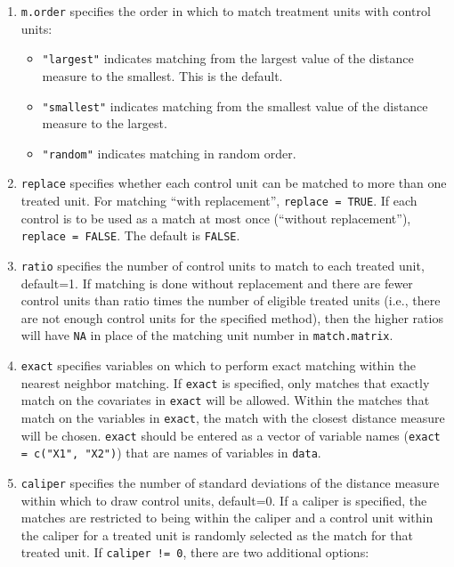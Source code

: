 \documentclass[oneside,letterpaper,titlepage]{article}
\begin{document}
\begin{enumerate}
\item \texttt{m.order}  specifies the order in which to match
  treatment units with control units:
  \begin{itemize}
  \item {\tt "largest"} indicates matching from the largest value of
    the distance measure to the smallest. This is the default.
  \item {\tt "smallest"} indicates matching from the smallest value of
    the distance measure to the largest.
  \item {\tt "random"} indicates matching in random order.
  \end{itemize}
\item \texttt{replace} specifies whether each control unit can be
  matched to more than one treated unit.  For matching ``with
  replacement'', \texttt{replace = TRUE}.  If each control is to be
  used as a match at most once (``without replacement''), \texttt{replace
    = FALSE}. The default is {\tt FALSE}.
\item \texttt{ratio} specifies the number of control units to match to
  each treated unit, default=1.  If matching is done without
  replacement and there are fewer control units than ratio times the
  number of eligible treated units (i.e., there are not enough control 
  units for the specified method), then the higher ratios will have
  \texttt{NA} in place of the matching unit number in
  \texttt{match.matrix}.
\item \texttt{exact} specifies variables on which to perform exact
  matching within the nearest neighbor matching.  If \texttt{exact} is
  specified, only matches that exactly match on the covariates in
  \texttt{exact} will be allowed.  Within the matches that match on
  the variables in \texttt{exact}, the match with the closest distance
  measure will be chosen.  \texttt{exact} should be entered as a
  vector of variable names (\texttt{exact = c("X1", "X2")}) that are
  names of variables in \texttt{data}.
\item \texttt{caliper} specifies the number of standard deviations of
  the distance measure within which to draw control units, default=0.
  If a caliper is specified, the matches are restricted to being
  within the caliper and a control unit within the caliper for a
  treated unit is randomly selected as the match for that treated
  unit.  If \texttt{caliper != 0}, there are two additional options:
  \begin{itemize} 

\end{itemize}
\end{enumerate}
\end{document}
